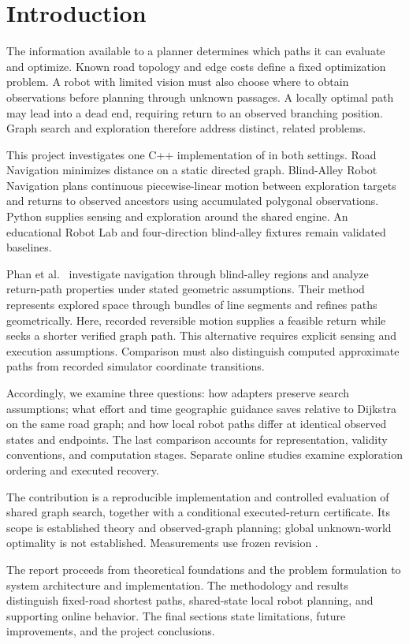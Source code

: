 \section{Introduction}
The information available to a planner determines which paths it can evaluate and optimize. Known road topology and edge costs define a fixed optimization problem. A robot with limited vision must also choose where to obtain observations before planning through unknown passages. A locally optimal path may lead into a dead end, requiring return to an observed branching position. Graph search and exploration therefore address distinct, related problems.

This project investigates one C++ implementation of \astar{} in both settings. Road Navigation minimizes distance on a static directed graph. Blind-Alley Robot Navigation plans continuous piecewise-linear motion between exploration targets and returns to observed ancestors using accumulated polygonal observations. Python supplies sensing and exploration around the shared engine. An educational Robot Lab and four-direction blind-alley fixtures remain validated baselines.

Phan et al.~\cite{phan2026} investigate navigation through blind-alley regions and analyze return-path properties under stated geometric assumptions. Their method represents explored space through bundles of line segments and refines paths geometrically. Here, recorded reversible motion supplies a feasible return while \astar{} seeks a shorter verified graph path. This alternative requires explicit sensing and execution assumptions. Comparison must also distinguish computed approximate paths from recorded simulator coordinate transitions.

Accordingly, we examine three questions: how adapters preserve search assumptions; what effort and time geographic guidance saves relative to Dijkstra on the same road graph; and how local robot paths differ at identical observed states and endpoints. The last comparison accounts for representation, validity conventions, and computation stages. Separate online studies examine exploration ordering and executed recovery.

The contribution is a reproducible implementation and controlled evaluation of shared graph search, together with a conditional executed-return certificate. Its scope is established \astar{} theory and observed-graph planning; global unknown-world optimality is not established. Measurements use frozen revision .

The report proceeds from theoretical foundations and the problem formulation to system architecture and implementation. The methodology and results distinguish fixed-road shortest paths, shared-state local robot planning, and supporting online behavior. The final sections state limitations, future improvements, and the project conclusions.
